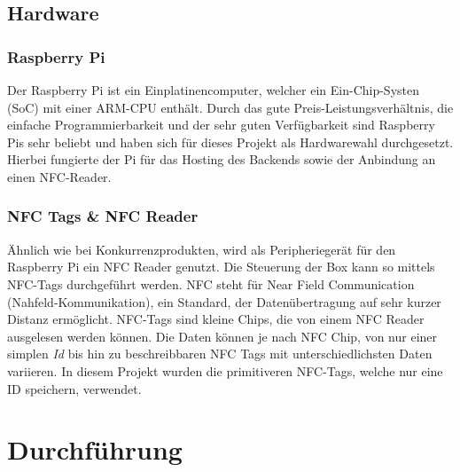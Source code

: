 \documentclass[10pt, a4paper]{article}
\begin{document}
\begin{onehalfspace}
  \subsection{Hardware}
  \subsubsection*{Raspberry Pi}
    Der Raspberry Pi ist ein Einplatinencomputer, welcher ein Ein-Chip-Systen (SoC) mit einer ARM-CPU enthält.
    Durch das gute Preis-Leistungsverhältnis, die einfache Programmierbarkeit und der sehr guten Verfügbarkeit sind Raspberry Pis sehr beliebt und haben sich für dieses Projekt als Hardwarewahl durchgesetzt.
    Hierbei fungierte der Pi für das Hosting des Backends sowie der Anbindung an einen NFC-Reader.

  \subsubsection*{NFC Tags \& NFC Reader}
    Ähnlich wie bei Konkurrenzprodukten, wird als Peripheriegerät für den Raspberry Pi ein NFC Reader genutzt.
    Die Steuerung der Box kann so mittels NFC-Tags durchgeführt werden.
    NFC steht für \glqq Near Field Communication\grqq{} (Nahfeld-Kommunikation), ein Standard, der
    Datenübertragung auf sehr kurzer Distanz ermöglicht.
    NFC-Tags sind kleine Chips, die von einem NFC Reader ausgelesen werden können. Die Daten können je nach
    NFC Chip, von nur einer simplen \textit{Id} bis hin zu beschreibbaren NFC Tags mit unterschiedlichsten Daten
    variieren. In diesem Projekt wurden die primitiveren NFC-Tags, welche nur eine ID speichern, verwendet.

  \section{Durchführung}

\end{onehalfspace}
\end{document}

